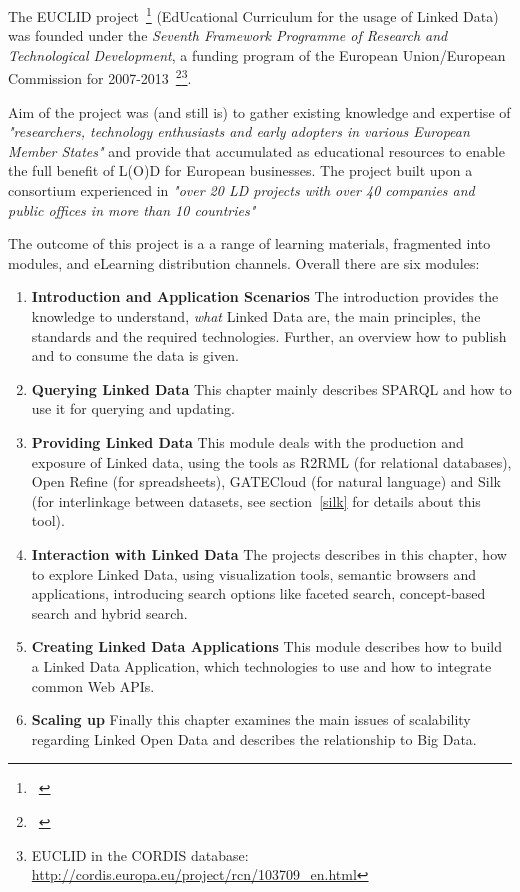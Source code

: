 The EUCLID project~\footnote{~\cite{euclid:home}} (EdUcational Curriculum for the usage of Linked Data) was founded under the \emph{Seventh Framework Programme of Research and Technological Development}, a funding program of the European Union/European Commission for 2007-2013~\footnote{~\cite{eu:fp7}}\footnote{ EUCLID in the CORDIS database: \url{http://cordis.europa.eu/project/rcn/103709_en.html}}.

Aim of the project was (and still is) to gather existing knowledge and expertise of \emph{"researchers, technology enthusiasts and early adopters in various European Member States"} and provide that accumulated as educational resources to enable the  full benefit of L(O)D for European businesses. The project built upon a consortium experienced in \emph{"over 20 LD projects with over 40 companies and public offices in more than 10 countries"}~\cite{euclid:about}

The outcome of this project is a a range of learning materials, fragmented into modules, and eLearning distribution channels. Overall there are six modules:

\begin{enumerate}

	\item \textbf{Introduction and Application Scenarios}
	The introduction provides the knowledge to understand, \emph{what} Linked Data are, the main principles, the standards and the required technologies. Further, an overview how to publish and to consume the data is given.
	
	\item \textbf{Querying Linked Data}
	This chapter mainly describes SPARQL and how to use it for querying and updating.
	
	\item \textbf{Providing Linked Data}
	This module deals with the production and exposure of Linked data, using the tools as R2RML (for relational databases), Open Refine (for spreadsheets), GATECloud (for natural language) and Silk (for interlinkage between datasets, see section~\ref{silk} for details about this tool).
	
	\item \textbf{Interaction with Linked Data}
	The projects describes in this chapter, how to explore Linked Data, using visualization tools, semantic browsers and applications, introducing search options like faceted search, concept-based search and hybrid search.
	
	\item \textbf{Creating Linked Data Applications}
	This module describes how to build a Linked Data Application, which technologies to use and how to integrate common Web APIs.
	
	\item \textbf{Scaling up}
	Finally this chapter examines the main issues of scalability regarding Linked Open Data and describes the relationship to Big Data.
	
\end{enumerate}

